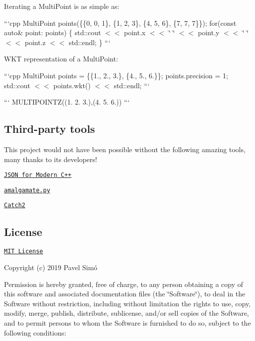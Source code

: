 Iterating a {\ttfamily Multi\-Point} is as simple as\-:

```cpp Multi\-Point points(\{\{0, 0, 1\}, \{1, 2, 3\}, \{4, 5, 6\}, \{7, 7, 7\}\}); for(const auto\& point\-: points) \{ std\-::cout $<$$<$ point.\-x $<$$<$ \char`\"{} \char`\"{} $<$$<$ point.\-y $<$$<$ \char`\"{} \char`\"{} $<$$<$ point.\-z $<$$<$ std\-::endl; \} ```

W\-K\-T representation of a {\ttfamily Multi\-Point}\-:

```cpp Multi\-Point points = \{\{1., 2., 3.\}, \{4., 5., 6.\}\}; points.\-precision = 1; std\-::cout $<$$<$ points.\-wkt() $<$$<$ std\-::endl; ```

``` M\-U\-L\-T\-I\-P\-O\-I\-N\-T\-Z((1. 2. 3.),(4. 5. 6.)) ```

\subsection*{Third-\/party tools}

This project would not have been possible without the following amazing tools, many thanks to its developers!


\begin{DoxyItemize}
\item \href{https://github.com/nlohmann/json}{\tt J\-S\-O\-N for Modern C++}
\item \href{https://github.com/edlund/amalgamate}{\tt amalgamate.\-py}
\item \href{https://github.com/catchorg/Catch2}{\tt Catch2}
\end{DoxyItemize}

\subsection*{License}



\href{http://opensource.org/licenses/MIT}{\tt M\-I\-T License}

Copyright (c) 2019 Pavel Simó

Permission is hereby granted, free of charge, to any person obtaining a copy of this software and associated documentation files (the \char`\"{}\-Software\char`\"{}), to deal in the Software without restriction, including without limitation the rights to use, copy, modify, merge, publish, distribute, sublicense, and/or sell copies of the Software, and to permit persons to whom the Software is furnished to do so, subject to the following conditions\-:

